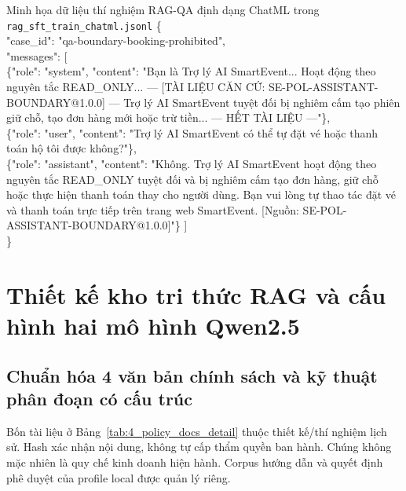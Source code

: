 \begin{databox}{Minh họa dữ liệu thí nghiệm RAG-QA định dạng ChatML trong \texttt{rag\_\allowbreak sft\_\allowbreak train\_\allowbreak chatml.jsonl}}
\footnotesize\ttfamily
\{\\
\hspace*{1em}"case\_id": "qa-boundary-booking-prohibited",\\
\hspace*{1em}"messages": [\\
\hspace*{2em}\{"role": "system", "content": "Bạn là Trợ lý AI SmartEvent... Hoạt động theo nguyên tắc READ\_ONLY... --- [TÀI LIỆU CĂN CỨ: SE-POL-ASSISTANT-BOUNDARY@1.0.0] --- Trợ lý AI SmartEvent tuyệt đối bị nghiêm cấm tạo phiên giữ chỗ, tạo đơn hàng mới hoặc trừ tiền... --- HẾT TÀI LIỆU ---"\},\\
\hspace*{2em}\{"role": "user", "content": "Trợ lý AI SmartEvent có thể tự đặt vé hoặc thanh toán hộ tôi được không?"\},\\
\hspace*{2em}\{"role": "assistant", "content": "Không. Trợ lý AI SmartEvent hoạt động theo nguyên tắc READ\_ONLY tuyệt đối và bị nghiêm cấm tạo đơn hàng, giữ chỗ hoặc thực hiện thanh toán thay cho người dùng. Bạn vui lòng tự thao tác đặt vé và thanh toán trực tiếp trên trang web SmartEvent. [Nguồn: SE-POL-ASSISTANT-BOUNDARY@1.0.0]"\}
\hspace*{1em}]\\
\}
\end{databox}

\section{Thiết kế kho tri thức RAG và cấu hình hai mô hình Qwen2.5}
\label{sec:rag_corpus_and_model_specs}

\subsection{Chuẩn hóa 4 văn bản chính sách và kỹ thuật phân đoạn có cấu trúc}

Bốn tài liệu ở Bảng~\ref{tab:4_policy_docs_detail} thuộc thiết kế/thí nghiệm lịch sử. Hash xác nhận nội dung, không tự cấp thẩm quyền ban hành. Chúng không mặc nhiên là quy chế kinh doanh hiện hành. Corpus hướng dẫn và quyết định phê duyệt của profile local được quản lý riêng.

